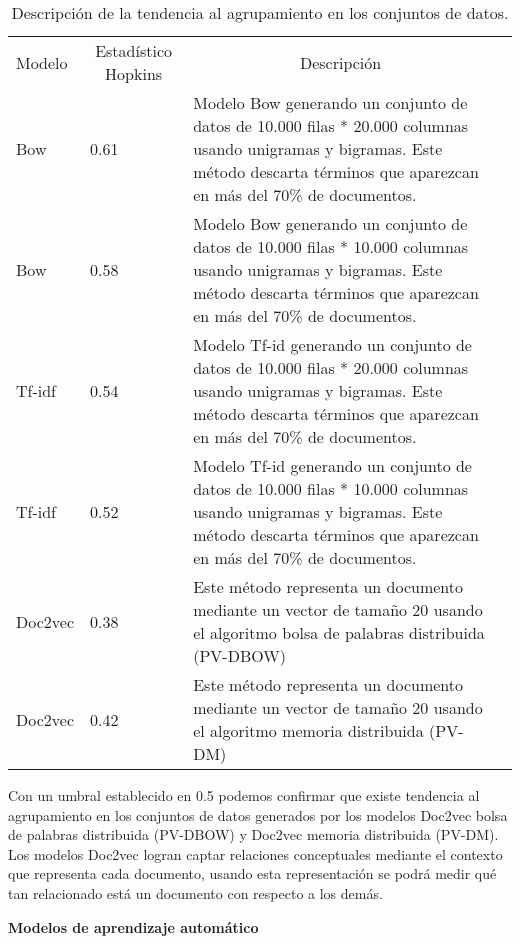 \begin{table}[H]\centering
	\caption{Descripción de la tendencia al agrupamiento en los conjuntos de datos.}\label{tab:ProgramasDM}
	\begin{tabularx}{\textwidth}{XXXm{6.0cm}}\toprule

Modelo &  \multicolumn{1}{c}{Estadístico Hopkins} & \multicolumn{1}{c}{Descripción} \\ 
Bow & 0.61 & Modelo Bow generando un conjunto de datos de 10.000 filas * 20.000 
columnas usando unigramas y bigramas.
Este método descarta términos que aparezcan en más del 70\% de documentos.  \\ 
Bow &  0.58 & Modelo Bow generando un conjunto de datos de 10.000 filas * 10.000 
columnas usando unigramas y bigramas.
Este método descarta términos que aparezcan en más del 70\% de documentos.   \\ 
Tf-idf & 0.54 & Modelo Tf-id generando un conjunto de datos de 10.000 filas * 20.000 
columnas usando unigramas y bigramas.
Este método descarta términos que aparezcan en más del 70\% de documentos.  \\ 
Tf-idf &  0.52 & Modelo Tf-id generando un conjunto de datos de 10.000 filas * 10.000 
columnas usando unigramas y bigramas.
Este método descarta términos que aparezcan en más del 70\% de documentos.   \\ 
Doc2vec & 0.38 & Este método representa un documento mediante 
un vector de tamaño 20
usando el algoritmo bolsa de palabras distribuida  (PV-DBOW)   \\ 
Doc2vec & 0.42  & Este método representa un documento mediante
un vector de tamaño 20
usando el algoritmo memoria distribuida (PV-DM) \\  \bottomrule
	\end{tabularx}

\end{table}

Con un umbral establecido en 0.5 podemos confirmar que existe tendencia al agrupamiento en los conjuntos de datos generados por los modelos Doc2vec bolsa de palabras distribuida (PV-DBOW) y Doc2vec memoria distribuida (PV-DM).
Los modelos Doc2vec  logran captar relaciones conceptuales mediante el contexto que representa cada documento, usando esta representación se podrá medir qué tan relacionado está un documento con respecto a los demás.	

\textbf{Modelos de aprendizaje automático  }

